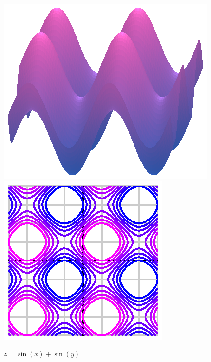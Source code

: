 \begin{figure}[ht]
  \begin{center}
    \includegraphics{figures/sinxy.eps}
    \hspace*{30pt}
    \includegraphics{figures/sinxy_contours.eps}
  \end{center}
  \caption{$z=\sin(x)+\sin(y)$}
\end{figure}
\clearpage
